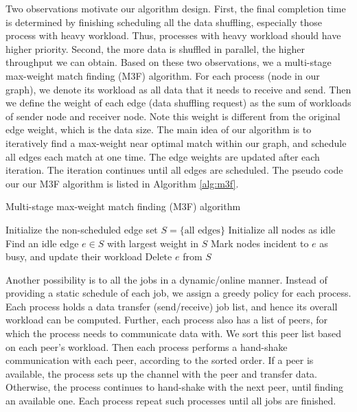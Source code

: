 \documentclass{acm_proc_article-sp}
\begin{document}
 Two observations motivate our algorithm design. First,  the final completion time is determined by finishing scheduling all the data shuffling, especially those process with heavy workload. 
Thus, processes with heavy workload should have higher priority. Second, the more data is shuffled in parallel, the higher throughput we can obtain. Based on these two observations, we a multi-stage max-weight match finding (M3F) algorithm. For each process (node in our graph), we denote its workload as all data that it needs to receive and send. Then we define the weight of each edge (data shuffling request) as the sum of  workloads of sender node and receiver node. Note this weight is different from the original edge weight, which is the data size. The main idea of our algorithm is to iteratively find a max-weight near optimal match within our graph, and schedule all edges each match at one time. The edge weights are updated after each iteration. The iteration continues until all edges are scheduled. The pseudo code our our M3F algorithm is listed in Algorithm \ref{alg:m3f}.


\begin{algorithm}
\caption{Multi-stage max-weight match finding (M3F) algorithm}
\label{alg:m3f}
\begin{algorithmic}[1]
\STATE Initialize the non-scheduled edge set $S = \{\mbox{all edges}\}$ 
\REPEAT 
\STATE Initialize all nodes as idle
\REPEAT
\STATE Find an idle edge $e  \in S$ with largest weight in $S$
\STATE Mark nodes incident to $e$ as busy, and update their workload 
\STATE Delete $e$ from $S$
\end{algorithmic}
\end{algorithm}

Another   possibility is to all the jobs in a dynamic/online  manner. Instead of providing a static schedule of each job, we assign a greedy policy for each process. 
Each process holds a data transfer (send/receive) job list, and hence its overall workload can be computed. Further, each process also has a list 
of peers, for which the process needs to communicate data with. We sort this peer list based on each peer's workload.
Then each process performs a hand-shake communication with each peer, according to the sorted order.
If a peer is available, the process sets up the channel with the peer and transfer data. Otherwise, the process continues to hand-shake with the next peer, until finding an available one.
Each process repeat such processes until all jobs are finished.
\end{document}
